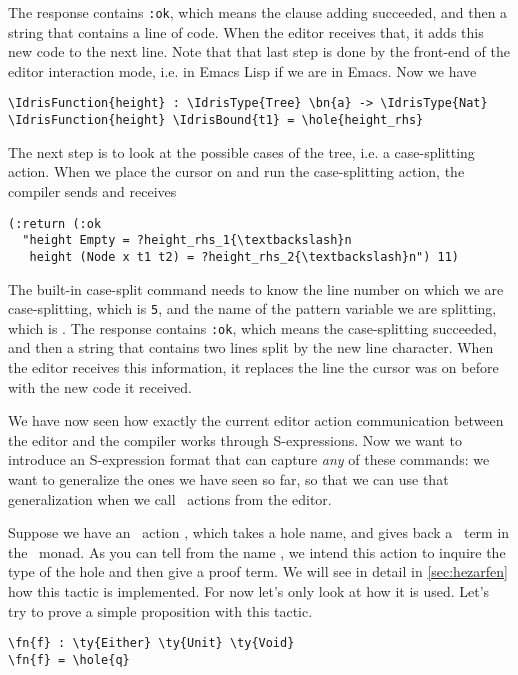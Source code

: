 The response contains \texttt{:ok}, which means the clause adding succeeded,
and then a string that contains a line of code.
When the editor receives that, it adds this new code to the next
line. Note that that last step is done by the front-end of the editor
interaction mode, i.e. in Emacs Lisp if we are in Emacs. Now we have

\begin{Verbatim}
\IdrisFunction{height} : \IdrisType{Tree} \bn{a} -> \IdrisType{Nat}
\IdrisFunction{height} \IdrisBound{t1} = \hole{height_rhs}
\end{Verbatim}

The next step is to look at the possible cases of the tree, i.e. a
case-splitting action.  When we place the cursor on  and run the
case-splitting action, the compiler sends  and receives
\begin{Verbatim}
(:return (:ok
  "height Empty = ?height_rhs_1{\textbackslash}n
   height (Node x t1 t2) = ?height_rhs_2{\textbackslash}n") 11)
\end{Verbatim}

The built-in case-split command needs to know the line number on which we are
case-splitting, which is \texttt{5}, and the name of the pattern variable we are
splitting, which is .  The response contains \texttt{:ok}, which means
the case-splitting succeeded, and then a string that contains two lines split
by the new line character. When the editor receives this information, it
replaces the line the cursor was on before with the new code it received.

We have now seen how exactly the current editor action communication between
the editor and the compiler works through S-expressions.
Now we want to introduce an S-expression format that can capture \emph{any} of
these commands: we want to generalize the ones we have seen so far, so that we
can use that generalization when we call \Elab\ actions from the editor.

Suppose we have an \Elab\ action , which takes a hole name, and gives back a \TT\ term in the \Elab\
monad. As you can tell from the name , we intend this action to
inquire the type of the hole and then give a proof term.
We will see in detail in \autoref{sec:hezarfen} how this tactic is
implemented. For now let's only look at how it is used.
Let's try to prove a simple proposition with this tactic.

\begin{Verbatim}
\fn{f} : \ty{Either} \ty{Unit} \ty{Void}
\fn{f} = \hole{q}
\end{Verbatim}

